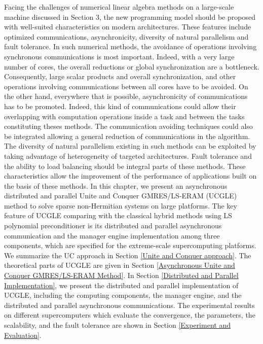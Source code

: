 \begin{displayquote}
	
	\textsf{Facing the challenges of numerical linear algebra methods on a large-scale machine discussed in Section 3, the new programming model should be proposed with well-suited characteristics on modern architectures. These features include optimized communications, asynchronicity, diversity of natural parallelism and fault tolerance. In such numerical methods, the avoidance of operations involving synchronous communications is most important. Indeed, with a very large number of cores, the overall reductions or global synchronization are a bottleneck. Consequently, large scalar products and overall synchronization, and other operations involving communications between all cores have to be avoided. On the other hand, everywhere that is possible, asynchronicity of communications has to be promoted. Indeed, this kind of communications could allow their overlapping with computation operations inside a task and between the tasks constituting theses methods. The communication avoiding techniques could also be integrated allowing a general reduction of communications in the algorithm. The diversity of natural parallelism existing in such methods can be exploited by taking advantage of heterogeneity of targeted architectures. Fault tolerance and the ability to load balancing should be integral parts of these methods. These characteristics allow the improvement of the performance of applications built on the basis of these methods. In this chapter, we present an asynchronous distributed and parallel Unite and Conquer GMRES/LS-ERAM (UCGLE) method to solve sparse non-Hermitian systems on large platforms. The key feature of UCGLE comparing with the classical hybrid methods using LS polynomial preconditioner \cite{essai1999heterogeneous,he2006hybrid} is its distributed and parallel asynchronous communication and the manager engine implementation among three components, which are specified for the extreme-scale supercomputing platforms. We summarize the UC approach in Section \ref{Unite and Conquer approach}. The theoretical parts of UCGLE are given in Section \ref{Asynchronous Unite and Conquer GMRES/LS-ERAM Method}. In Section \ref{Distributed and Parallel Implementation}, we present the distributed and parallel implementation of UCGLE, including the computing components, the manager engine, and the distributed and parallel asynchronous communications. The experimental results on different supercomputers which evaluate the convergence, the parameters, the scalability, and the fault tolerance are shown in Section \ref{Experiment and Evaluation}.}
\end{displayquote}

